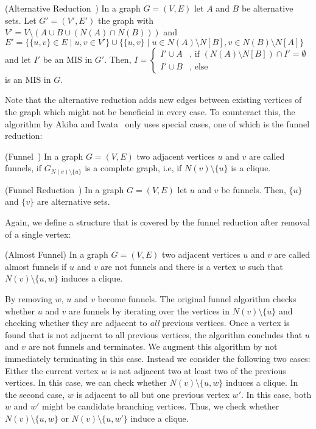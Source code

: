 \documentclass[a4paper,UKenglish,cleveref, autoref, thm-restate]{lipics-v2021}
\begin{document}
\begin{theorem} (Alternative Reduction~\cite{XiaoUnconfined})
	In a graph $G=(V,E)$ let $A$ and $B$ be alternative sets. Let $G'=(V', E')$
    the graph with $V' = V\setminus(A\cup B\cup (N(A)\cap N(B)))$ and $E' =
    \{\{u,v\} \in E \mid u,v \in V'\} \cup \{ \{u,v\}\;|\; u\in
    N(A)\setminus N[B], v\in N(B)\setminus N[A] \}$ and let $I'$ be an MIS in $G'$. Then,
	$
    I=\begin{cases}
      I'\cup A & \text{, if } (N(A)\setminus N[B]) \cap I' = \emptyset%
      \\
      I'\cup B & \text{, else}
	\end{cases}
    $
	is an MIS in $G$.
\end{theorem}

Note that the alternative reduction adds new edges between existing
vertices of the graph which might not be beneficial in every case. To counteract this, the algorithm
by Akiba and Iwata~\cite{AkibaIwata} only uses special cases, one of which is
the funnel reduction:

\begin{definition} (Funnel~\cite{XiaoUnconfined})
	In a graph $G=(V,E)$ two adjacent vertices $u$ and $v$ are called funnels, if $G_{N(v)\setminus\{u\}}$ is a complete graph, i.e, if $N(v)\setminus\{u\}$ is a clique.
\end{definition}
\begin{theorem} (Funnel Reduction~\cite{XiaoUnconfined}) In a graph $G=(V,E)$ let $u$ and $v$ be funnels. Then, $\{u\}$ and $\{v\}$ are alternative sets.	
\end{theorem}

Again, we define a structure that is covered by the funnel reduction after
removal of a single vertex:

\begin{definition}(Almost Funnel)
  In a graph $G=(V,E)$ two adjacent vertices $u$ and $v$ are called almost funnels if $u$ and $v$ are not funnels and there is a vertex $w$ such that $N(v)\setminus\{u,w\}$ induces a clique.
\end{definition}

By removing $w$, $u$ and $v$ become funnels. The original funnel algorithm
checks whether $u$ and $v$ are funnels by iterating over the vertices in $N(v) \setminus \{u\}$
and checking whether they are adjacent to \emph{all} previous vertices. Once a vertex
is found that is not adjacent to all previous vertices, the algorithm concludes
that $u$ and $v$ are not funnels and terminates. We augment this algorithm by
not immediately terminating in this case. Instead we consider the following two
cases: Either the current vertex $w$ is not adjacent two at least two of the
previous vertices. In this case, we can check whether $N(v) \setminus \{u, w\}$
induces a clique. In the second case, $w$ is adjacent to all but one previous
vertex $w'$. In this case, both $w$ and $w'$ might be candidate branching
vertices. Thus, we check whether $N(v) \setminus \{u, w\}$ or $N(v) \setminus
\{u, w'\}$ induce a clique.
\end{document}
